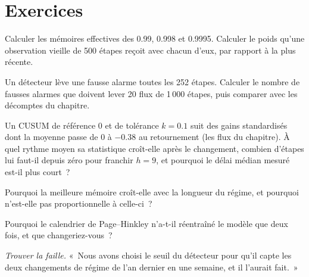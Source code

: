 \section{Exercices}

\begin{exercise}[$\star$]\label{exo:ml:online-learning-and-drift:1}
Calculer les mémoires effectives des  0.99, 0.998 et 0.9995. Calculer le poids
qu'une observation vieille de 500 étapes reçoit avec chacun d'eux, par rapport à la plus récente.
\end{exercise}

\begin{exercise}[$\star$]\label{exo:ml:online-learning-and-drift:2}
Un détecteur lève une fausse alarme toutes les 252 étapes. Calculer le nombre de fausses alarmes que doivent lever 20 flux de 1\,000 étapes, puis comparer
avec les décomptes du chapitre.
\end{exercise}

\begin{exercise}[$\star$]\label{exo:ml:online-learning-and-drift:3}
Un CUSUM de référence 0 et de tolérance $k = 0.1$ suit des gains standardisés dont la moyenne passe de 0 à $-0.38$ au
retournement (les flux du chapitre). À quel rythme moyen sa statistique croît-elle après le changement, combien d'étapes lui faut-il depuis zéro
pour franchir $h = 9$, et pourquoi le délai médian mesuré est-il plus court~?
\end{exercise}

\begin{exercise}[$\star\star$]\label{exo:ml:online-learning-and-drift:4}
Pourquoi la meilleure mémoire croît-elle avec la longueur du régime, et pourquoi n'est-elle pas proportionnelle à celle-ci~?
\end{exercise}

\begin{exercise}[$\star\star$]\label{exo:ml:online-learning-and-drift:5}
Pourquoi le calendrier de Page--Hinkley n'a-t-il réentraîné le modèle que deux fois, et que changeriez-vous~?
\end{exercise}

\begin{exercise}[$\star\star$]\label{exo:ml:online-learning-and-drift:6}
\emph{Trouver la faille.} «~Nous avons choisi le seuil du détecteur pour qu'il capte les deux changements de régime de l'an dernier en une semaine,
et il l'aurait fait.~»
\end{exercise}

